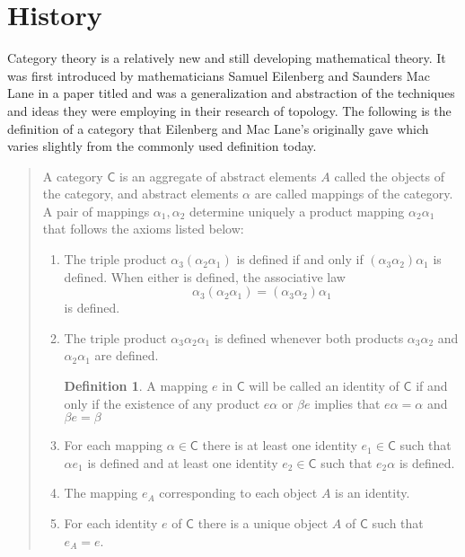 \documentclass[11pt]{article}
\newcommand{\C}{\mathsf{C}}
\theoremstyle{definition}
\newtheorem{definition}{Definition}
\begin{document}

\section{History}
Category theory is a relatively new and still developing mathematical theory. 
It was first introduced by mathematicians Samuel Eilenberg and Saunders Mac Lane in a paper titled  \cite{SamuelEilenberg1945Gton} and was a generalization and abstraction of the techniques and ideas they were employing in their research of topology.
The following is the definition of a category that Eilenberg and Mac Lane's originally gave which varies slightly from the commonly used definition today.

\begin{quote}
    A category $\mathsf{C}$ is an aggregate of abstract elements $A$ called the objects of the category, and abstract elements $\alpha$ are called mappings of the category. A pair of mappings $\alpha_1,\alpha_2$ determine uniquely a product mapping $\alpha_2\alpha_1$ that follows the axioms listed below:
    
    \begin{enumerate}[\bfseries {C}1.]
        
        \item The triple product $\alpha_3(\alpha_2\alpha_1)$ is defined if and only if $(\alpha_3\alpha_2)\alpha_1$ is defined. When either is defined, the associative law 
        \[\alpha_3(\alpha_2\alpha_1) = (\alpha_3\alpha_2)\alpha_1\]
        is defined.
        
        \item The triple product $\alpha_3\alpha_2\alpha_1$ is defined whenever both products $\alpha_3\alpha_2$ and $\alpha_2\alpha_1$ are defined.
        \begin{definition}
        A mapping $e$ in $\C$ will be called an identity of $\C$ if and only if the existence of any product $e\alpha$ or $\beta e$ implies that $e\alpha = \alpha$ and $\beta e = \beta$
        \end{definition}
        
        \item For each mapping $\alpha \in \C$ there is at least one identity $e_1 \in \C$ such that $\alpha e_1$ is defined and at least one identity $e_2 \in \C$ such that $e_2 \alpha$ is defined.
        
        \item The mapping $e_A$ corresponding to each object $A$ is an identity.
        
        \item For each identity $e$ of $\C$ there is a unique object $A$ of $\C$ such that $e_A = e$. 
        
    \end{enumerate}
\end{quote}
\end{document}
